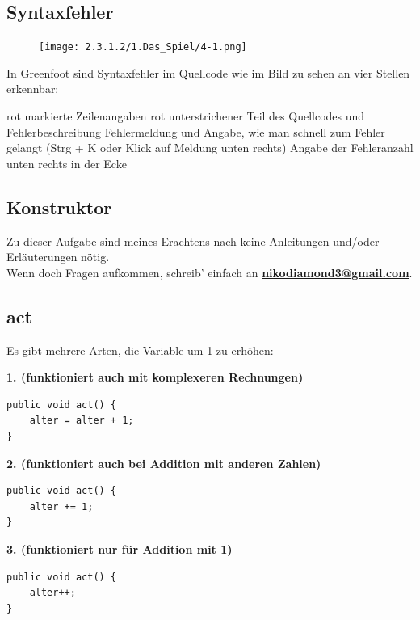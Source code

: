 \documentclass{scrartcl}   %
\begin{document}
\newpage

\subsection{Syntaxfehler}

\begin{figure}[ht]
	\centering
	\texttt{[image: 2.3.1.2/1.Das\_Spiel/4-1.png]}
\end{figure}

In Greenfoot sind Syntaxfehler im Quellcode wie im Bild zu sehen an vier Stellen erkennbar:

\begin{itemize}
    \barrow rot markierte Zeilenangaben
    \barrow rot unterstrichener Teil des Quellcodes und Fehlerbeschreibung
    \barrow Fehlermeldung und Angabe, wie man schnell zum Fehler gelangt (Strg + K oder Klick auf Meldung unten rechts)
    \barrow Angabe der Fehleranzahl unten rechts in der Ecke
\end{itemize}

\subsection{Konstruktor}

Zu dieser Aufgabe sind meines Erachtens nach keine Anleitungen und/oder Erläuterungen nötig.\\
Wenn doch Fragen aufkommen, schreib' einfach an \textbf{\href{mailto:nikodiamond3@gmail.com}{nikodiamond3@gmail.com}}.

\subsection{act}

Es gibt mehrere Arten, die Variable um 1 zu erhöhen:

\textbf{1. (funktioniert auch mit komplexeren Rechnungen)}
\begin{lstlisting}
public void act() {
    alter = alter + 1;
}
\end{lstlisting}

\textbf{2. (funktioniert auch bei Addition mit anderen Zahlen)}
\begin{lstlisting}
public void act() {
    alter += 1;
}
\end{lstlisting}

\textbf{3. (funktioniert nur für Addition mit 1)}
\begin{lstlisting}
public void act() {
    alter++;
}
\end{lstlisting}
\end{document}

